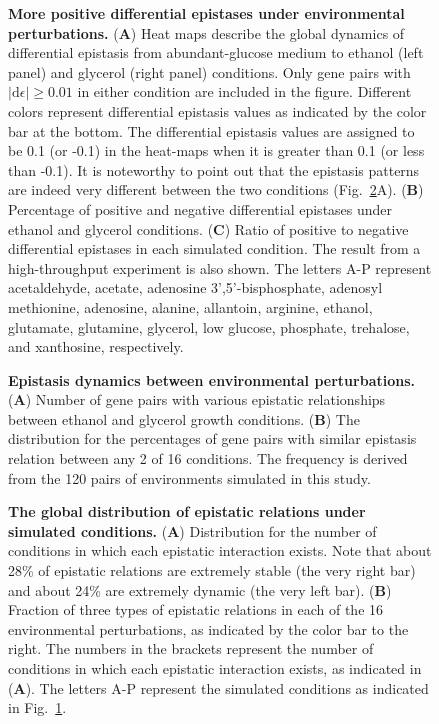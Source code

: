 \documentclass[10pt]{article}
\newcommand\D{\mathrm{d}}
\newcommand{\Fig}{Fig.}
\begin{document}
\begin{figure}[!htb]
\caption{
{\bf More positive differential epistases under environmental
perturbations.} (\textbf{A}) Heat maps describe the global dynamics of
differential epistasis from abundant-glucose medium to ethanol (left
panel) and glycerol (right panel) conditions. Only gene pairs with
$\left|\D\epsilon\right| \geq 0.01$ in either condition are included
in the figure. Different colors represent differential epistasis
values as indicated by the color bar at the bottom. The differential
epistasis values are assigned to be 0.1 (or -0.1) in the heat-maps
when it is greater than 0.1 (or less than -0.1). It is noteworthy to
point out that the epistasis patterns are indeed very different
between the two conditions (\Fig~\ref{fig:eef2}A). (\textbf{B})
Percentage of positive and negative differential epistases under
ethanol and glycerol conditions. (\textbf{C}) Ratio of positive to
negative differential epistases
in each simulated condition. The result from a high-throughput
experiment is also shown. The letters A-P represent acetaldehyde,
acetate, adenosine 3',5'-bisphosphate, adenosyl methionine, adenosine,
alanine, allantoin, arginine, ethanol, glutamate, glutamine, glycerol,
low glucose, phosphate, trehalose, and xanthosine, respectively.
}
\label{fig:eef1}
\end{figure}

\begin{figure}[!htb]
\caption{
{\bf Epistasis dynamics between environmental perturbations.} (\textbf{A}) 
Number of gene pairs with various epistatic relationships between ethanol and
glycerol growth conditions. (\textbf{B}) The distribution for the percentages
of gene pairs with similar epistasis relation between any 2 of 16
conditions. The frequency is derived from the 120 pairs of
environments simulated in this study.
}
\label{fig:eef2}
\end{figure}


\begin{figure}[!htb]
\caption{
{\bf The global distribution of epistatic relations under simulated
conditions.} (\textbf{A}) Distribution for the number of conditions in which
each epistatic interaction exists. Note that about 28\% of
epistatic relations are extremely stable (the very right bar) and
about 24\% are extremely dynamic (the very left bar). (\textbf{B}) Fraction
of three types of epistatic relations in each of the 16 environmental
perturbations, as indicated by the color bar to the right. The numbers
in the brackets represent the number of conditions in which each
epistatic interaction exists, as indicated in (\textbf{A}). The letters A-P
represent the simulated conditions as indicated in \Fig~\ref{fig:eef1}.
}
\label{fig:eef3}
\end{figure}
\end{document}
